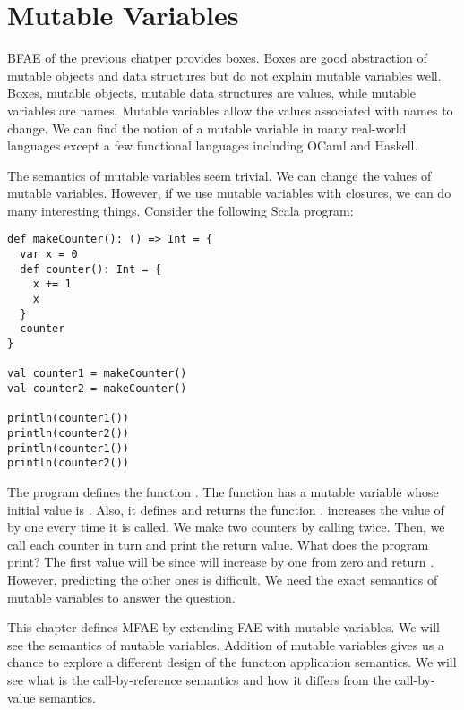 \setchapterpreamble[u]{\margintoc}
\chapter{Mutable Variables}

\renewcommand{\plang}{\textsf{FAE}\xspace}
\newcommand{\bfae}{\textsf{BFAE}\xspace}
\renewcommand{\lang}{\textsf{MFAE}\xspace}

\bfae of the previous chatper provides boxes. Boxes are good abstraction
of mutable objects and data structures but do not explain mutable variables
well. Boxes, mutable objects, mutable data structures are values, while mutable
variables are names. Mutable variables allow the values associated with
names to change. We can find the notion of a mutable variable in many
real-world languages except a few functional languages including OCaml and
Haskell.

The semantics of mutable variables seem trivial. We can change the values of
mutable variables. However, if we use mutable variables with closures, we can do
many interesting things. Consider the following Scala program:

\begin{verbatim}
def makeCounter(): () => Int = {
  var x = 0
  def counter(): Int = {
    x += 1
    x
  }
  counter
}

val counter1 = makeCounter()
val counter2 = makeCounter()

println(counter1())
println(counter2())
println(counter1())
println(counter2())
\end{verbatim}

The program defines the function . The function has a mutable
variable  whose initial value is . Also, it defines and returns the function
.  increases the value of  by
one every time it is called. We make two counters by calling 
twice. Then, we call each counter in turn and print the return value.
What does the program print? The first value will be  since
 will increase  by one from zero and return .
However, predicting the other ones is difficult. We need the exact semantics of
mutable variables to answer the question.

This chapter defines \lang by extending \plang with mutable variables.
We will see the semantics of mutable variables. Addition of mutable
variables gives us a chance to explore a different design of the function
application semantics. We will see what is the call-by-reference semantics and how
it differs from the call-by-value semantics.

